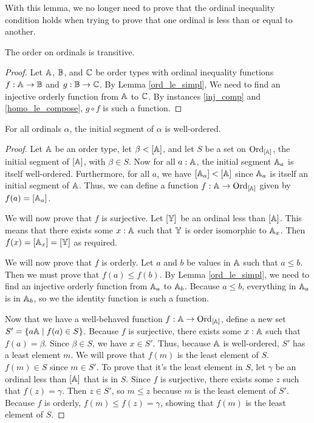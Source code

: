 \documentclass[../../math.tex]{subfiles}
\begin{document}
With this lemma, we no longer need to prove that the ordinal inequality
condition holds when trying to prove that one ordinal is less than or equal to
another.

\begin{instance}
    The order on ordinals is transitive.
\end{instance}
\begin{proof}
    Let $\mathbb{A}$, $\mathbb{B}$, and $\mathbb{C}$ be order types with ordinal inequality functions $f
    : \mathbb{A} \to \mathbb{B}$ and $g : \mathbb{B} \to \mathbb{C}$.  By Lemma \ref{ord_le_simpl}, We need to
    find an injective orderly function from $\mathbb{A}$ to $\mathbb{C}$.  By instances
    \ref{inj_comp} and \ref{homo_le_compose}, $g \circ f$ is such a function.
\end{proof}

\begin{lemma} \label{ords_lt_wo}
    For all ordinals $\alpha$, the initial segment of $\alpha$ is well-ordered.
\end{lemma}
\begin{proof}
    Let $\mathbb{A}$ be an order type, let $\beta < [\mathbb{A}]$, and let $S$ be a set on
    $\operatorname{Ord}_{[\mathbb{A}]}$, the initial segment of $[\mathbb{A}]$, with $\beta \in S$.  Now for
    all $a : \mathbb{A}$, the initial segment $\mathbb{A}_a$ is itself well-ordered.
    Furthermore, for all $a$, we have $[\mathbb{A}_a] < [\mathbb{A}]$ since $\mathbb{A}_a$ is itself an
    initial segment of $\mathbb{A}$.  Thus, we can define a function $f : \mathbb{A} \to
    \operatorname{Ord}_{[\mathbb{A}]}$ given by $f(a) = [\mathbb{A}_a]$.

    We will now prove that $f$ is surjective.  Let $[\mathbb{Y}]$ be an ordinal less
    than $[\mathbb{A}]$.  This means that there exists some $x : \mathbb{A}$ such that $\mathbb{Y}$ is
    order isomorphic to $\mathbb{A}_x$.  Then $f(x) = [\mathbb{A}_x] = [\mathbb{Y}]$ as required.

    We will now prove that $f$ is orderly.  Let $a$ and $b$ be values in $\mathbb{A}$
    such that $a \leq b$.  Then we must prove that $f(a) \leq f(b)$.  By Lemma
    \ref{ord_le_simpl}, we need to find an injective orderly function from
    $\mathbb{A}_a$ to $\mathbb{A}_b$.  Because $a \leq b$, everything in $\mathbb{A}_a$ is in $\mathbb{A}_b$, so
    we the identity function is such a function.

    Now that we have a well-behaved function $f : \mathbb{A} \to \operatorname{Ord}_{[\mathbb{A}]}$, define a
    new set $S' = \{a \mathbb{A} \mid f(a) \in S\}$.  Because $f$ is surjective, there
    exists some $x : \mathbb{A}$ such that $f(a) = \beta$.  Since $\beta \in S$, we have
    $x \in S'$.  Thus, because $\mathbb{A}$ is well-ordered, $S'$ has a least element
    $m$.  We will prove that $f(m)$ is the least element of $S$.  $f(m) \in S$
    since $m \in S'$.  To prove that it's the least element in $S$, let $\gamma$
    be an ordinal less than $[\mathbb{A}]$ that is in $S$.  Since $f$ is surjective,
    there exists some $z$ such that $f(z) = \gamma$.  Then $z \in S'$, so $m
    \leq z$ because $m$ is the least element of $S'$.  Because $f$ is orderly,
    $f(m) \leq f(z) = \gamma$, showing that $f(m)$ is the least element of $S$.
\end{proof}
\end{document}
